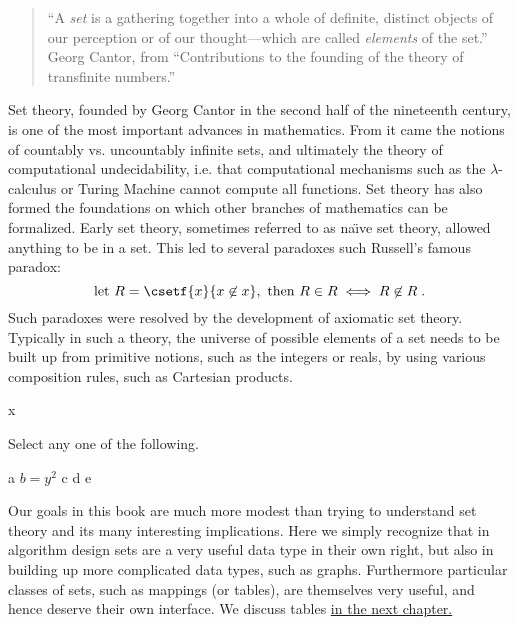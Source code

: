 \begin{gram}
\begin{quote}
``A \emph{set} is a gathering together into a whole of definite, distinct
objects of our perception or of our thought---which are called \emph{elements}
of the set.''\\[.1in] Georg Cantor, from ``Contributions to the founding of the theory of transfinite numbers.''
\end{quote}

Set theory, founded by Georg Cantor in the second half of the
nineteenth century, is one of the most important advances in
mathematics.  From it came the notions of countably vs. uncountably
infinite sets, and ultimately the theory of computational
undecidability, i.e. that computational mechanisms such as the
$\lambda$-calculus or Turing Machine cannot compute all functions.
Set theory has also formed the foundations on which other branches of
mathematics can be formalized.  Early set theory, sometimes referred
to as na\"{\i}ve set theory, allowed anything to be in a set.  This
led to several paradoxes such Russell's famous paradox:
  \[\mbox{let } R = \csetf{x}{x \not\in x}, \mbox{ then } R \in R \iff R \not\in R
\;.\] Such paradoxes were resolved by the development of axiomatic set
theory.  Typically in such a theory, the universe of possible elements
of a set needs to be built up from primitive notions, such as the
integers or reals, by using various composition rules, such as
Cartesian products.
\end{gram}
\begin{gram}
x
\end{gram}

\begin{gram}[10][Choices]
Select any one of the following.
\begin{anychoice}
\choice a
\choice $b = y^2$
\choice* c
\choice* d
\choice e
\end{anychoice}
\end{gram}

\begin{gram}[ 20  ] [ x]
\label{xy}
Our goals in this book are much more modest than trying to understand set theory and its many interesting implications.  Here we simply recognize that in algorithm design sets are a very useful data type in their own right, but also in building up more complicated data types, such as graphs.  Furthermore particular classes of sets, such as mappings (or tables), are themselves very useful, and hence deserve their own interface. 
%
We discuss tables \href{ch:tables}{in the next chapter.}

\end{gram}

